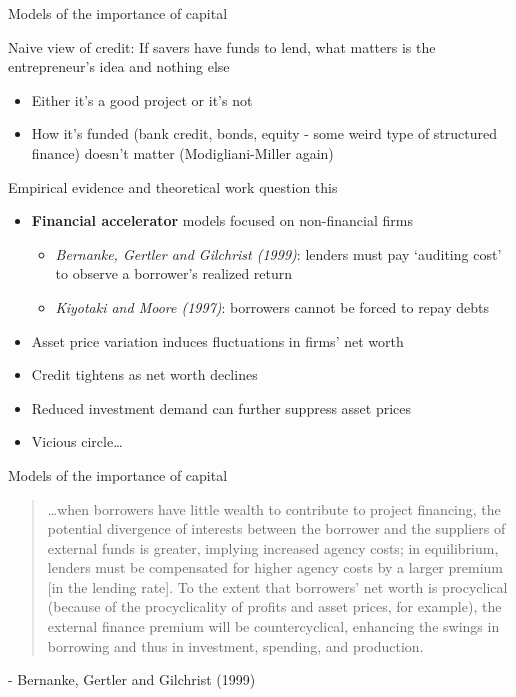 \begin{frame}{Models of the importance of capital}

Naive view of credit: If savers have funds to lend, what matters is the entrepreneur's idea and nothing else
	\begin{itemize}
	\item	Either it's a good project or it's not
	\item	How it's funded (bank credit, bonds, equity - some weird type of structured finance) doesn't matter (Modigliani-Miller again)
	\end{itemize}
\vspace{2mm}
Empirical evidence and theoretical work question this
	\begin{itemize}
	\item	\textbf{Financial accelerator} models focused on non-financial firms
		\begin{itemize}
		\item	\textit{Bernanke, Gertler and Gilchrist (1999)}: lenders must pay `auditing cost' to observe a borrower's realized return
		\item	\textit{Kiyotaki and Moore (1997)}: borrowers cannot be forced to repay debts
		\end{itemize}
	\item	Asset price variation induces fluctuations in firms' net worth
	\item	Credit tightens as net worth declines 
	\item	Reduced investment demand can further suppress asset prices
	\item	Vicious circle\ldots
	\end{itemize}

\end{frame}




\begin{frame}{Models of the importance of capital}

\begin{quote}
\ldots when borrowers have little wealth to contribute to project financing, the potential
divergence of interests between the borrower and the suppliers of external funds is
greater, implying increased agency costs; in equilibrium, lenders must be compensated
for higher agency costs by a larger premium [in the lending rate]. To the extent that borrowers' net worth is procyclical (because of the procyclicality of profits and asset prices, for example), the
external finance premium will be countercyclical, enhancing the swings in borrowing
and thus in investment, spending, and production. 
\end{quote}
\begin{center}
- Bernanke, Gertler and Gilchrist (1999)
\end{center}

\end{frame}

